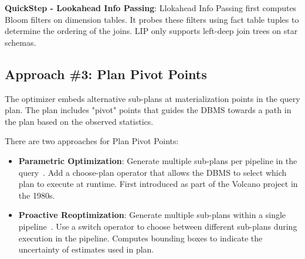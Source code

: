 \documentclass[11pt]{article}
\begin{document}
\textbf{QuickStep - Lookahead Info Passing}:
Llokahead Info Passing first computes Bloom filters on dimension tables. It probes these filters using fact table tuples to determine the ordering of the joins. LIP only supports left-deep join trees on star schemas.

\subsection*{Approach \#3: Plan Pivot Points}
The optimizer embeds alternative sub-plans at materialization points in the query plan. The plan includes "pivot" points that guides the DBMS towards a path in the plan based on the observed statistics.

There are two approaches for Plan Pivot Points:
\begin{itemize}
	\item \textbf{Parametric Optimization}:
	Generate multiple sub-plans per pipeline in the query~\cite{Graefe1989}.
	Add a choose-plan operator that allows the DBMS to select which plan to execute at runtime.
	First introduced as part of the Volcano project in the 1980s.
	
	\item \textbf{Proactive Reoptimization}:
	Generate multiple sub-plans within a single pipeline~\cite{Babu2005'}.
	Use a switch operator to choose between different sub-plans during execution in the pipeline.
	Computes bounding boxes to indicate the uncertainty of estimates used in plan. 
	
\end{itemize}

\newpage


\end{document}
